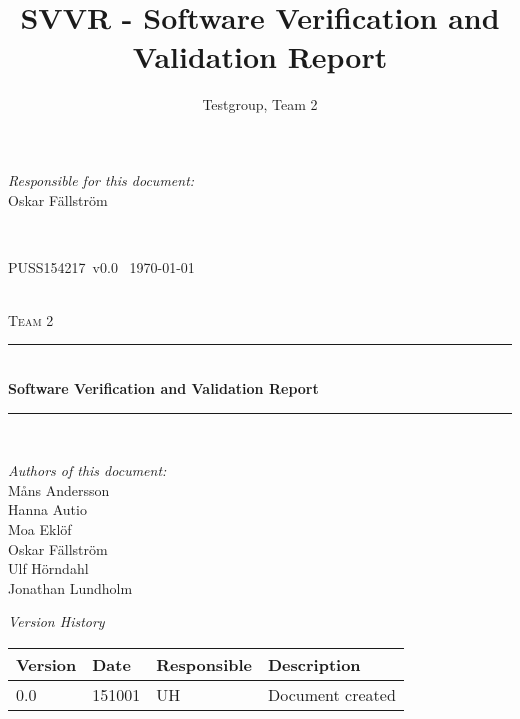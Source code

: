 \documentclass[a4paper]{article}
\title{SVVR - Software Verification and Validation Report}
\author{Testgroup, Team 2}
\newcommand{\version}{v0.0}
\newcommand{\SVVR}{PUSS154217}
\begin{document}
\begin{titlepage}
\newcommand{\HRule}{\rule{\linewidth}{0.5mm}}

\begin{minipage}{0.5\textwidth}
\begin{flushleft} %
\textit{Responsible for this document:}\\
Oskar Fällström %
\end{flushleft}
\end{minipage}
~
\begin{minipage}{0.4\textwidth}
\begin{flushright}
\SVVR\ \version\ %
\today
\end{flushright}
\end{minipage}\\[3cm]

\centering
\textsc{\LARGE Team 2}\\[0.5cm]

\HRule \\[0.4cm]
{ \huge \bfseries Software Verification and Validation Report}\\[0.4cm] %
\HRule \\[1.5cm]

\vfill
\begin{flushleft}
\textit{Authors of this document:}\\
Måns Andersson \\
Hanna Autio \\
Moa Eklöf \\
Oskar Fällström \\
Ulf Hörndahl \\
Jonathan Lundholm
\end{flushleft}	


\end{titlepage}

\begin{center}
\textit{\large Version History}

    \begin{tabular}{ | l | l | l | p{5cm} |}
    \hline
    \textbf{Version}		& \textbf{Date}		& \textbf{Responsible}					& \textbf{Description}					\\ \hline
    0.0						& 151001 			& UH									& Document created						\\ \hline
    \end{tabular}
\end{center}
\end{document}
